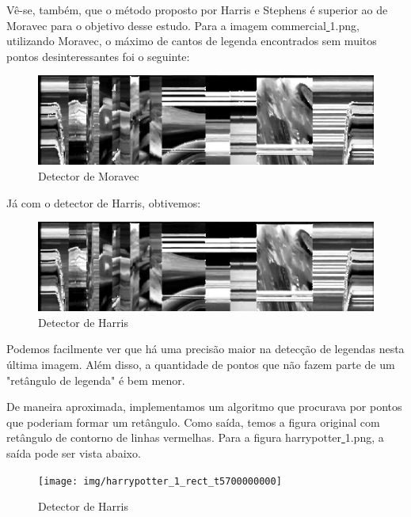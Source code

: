 \documentclass[10pt,a4paper]{article}
\begin{document}
Vê-se, também, que o método proposto por Harris e Stephens é superior ao de
Moravec para o objetivo desse estudo. Para a imagem
commercial\underline{ }1.png, utilizando
Moravec, o máximo de cantos de legenda encontrados sem muitos pontos
desinteressantes foi o seguinte:

\begin{figure}[h!]
  \begin{center}
    \includegraphics[scale=0.55]{img/commercial_1_moravec_t2500}
    \caption{Detector de Moravec}
  \end{center}
\end{figure}



Já com o detector de Harris, obtivemos:

\begin{figure}[h!]
  \begin{center}
    \includegraphics[scale=0.55]{img/commercial_1_t1125000000}
    \caption{Detector de Harris}
  \end{center}
\end{figure}


Podemos facilmente ver que há uma precisão maior na detecção de legendas nesta
última imagem. Além disso, a quantidade de pontos que não fazem parte de um
"retângulo de legenda" é bem menor.

\newpage

De maneira aproximada, implementamos um algoritmo que procurava por
pontos que poderiam formar um retângulo. Como saída, temos a figura original com
retângulo de contorno de linhas vermelhas. Para a figura
harrypotter\underline{ }1.png, a saída pode ser vista abaixo.

\begin{figure}[h!]
  \begin{center}
    \texttt{[image: img/harrypotter\_1\_rect\_t5700000000]}
    \caption{Detector de Harris}
  \end{center}
\end{figure}
\end{document}
